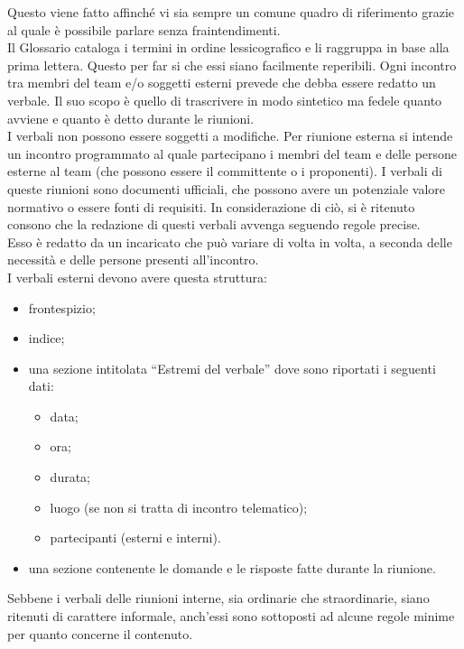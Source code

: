 					Questo viene fatto affinché vi sia sempre un comune quadro di riferimento grazie al quale è possibile parlare senza fraintendimenti.\\
					Il Glossario cataloga i termini in ordine lessicografico e li raggruppa in base alla prima lettera. Questo per far si che essi siano facilmente reperibili.
				 \label{sec:verbali}
					Ogni incontro tra membri del team e/o soggetti esterni prevede che debba essere redatto un verbale. Il suo scopo è quello di trascrivere in modo sintetico ma fedele quanto avviene e quanto è detto durante le riunioni.\\
					I verbali non possono essere soggetti a modifiche.
						Per riunione esterna si intende un incontro programmato al quale partecipano i membri del team e delle persone esterne al team (che possono essere il committente o i proponenti). I verbali di queste riunioni sono documenti ufficiali, che possono avere un potenziale valore normativo o essere fonti di requisiti. In considerazione di ciò, si è ritenuto consono che la redazione di questi verbali avvenga seguendo regole precise.\\
						Esso è redatto da un incaricato che può variare di volta in volta, a seconda delle necessità e delle persone presenti all’incontro.\\
						I verbali esterni devono avere questa struttura:
						\begin{itemize}
							\item frontespizio;
							\item indice;
							\item una sezione intitolata “Estremi del verbale” dove sono riportati i seguenti dati:
							\begin{itemize}
								\item data;
								\item ora;
								\item durata;
								\item luogo (se non si tratta di incontro telematico);
								\item partecipanti (esterni e interni).
							\end{itemize}
							\item una sezione contenente le domande e le risposte fatte durante la riunione.
						\end{itemize}
						Sebbene i verbali delle riunioni interne, sia ordinarie che straordinarie, siano ritenuti di carattere informale, anch'essi sono sottoposti ad alcune regole minime per quanto concerne il contenuto.  \\
